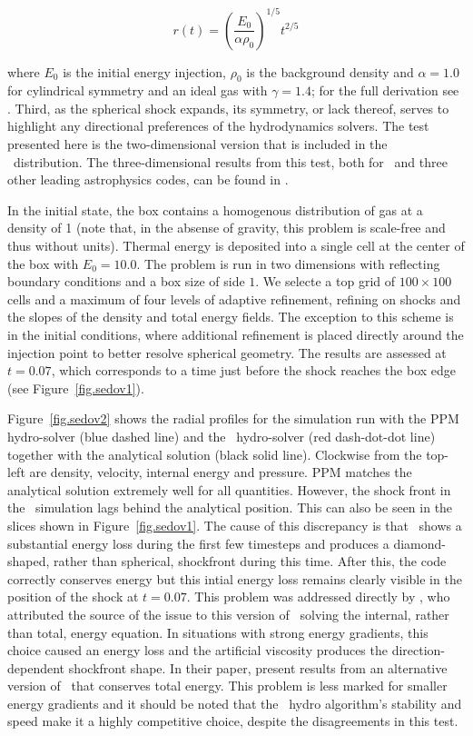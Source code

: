 \begin{equation} r(t) =
\left(\frac{E_0}{\alpha\rho_0}\right)^{1/5}t^{2/5}
\end{equation}

\noindent where $E_0$ is the initial energy injection, $\rho_0$ is the
background density and $\alpha = 1.0$ for cylindrical symmetry and an
ideal gas with $\gamma = 1.4$; for the full derivation see
\citet{Sedov1959}.  Third, as the spherical shock expands, its
symmetry, or lack thereof, serves to highlight any directional
preferences of the hydrodynamics solvers.  The test presented here is
the two-dimensional 
version that is included in the \enzo\ distribution. The
three-dimensional results from this test, both for \enzo\ and three
other leading astrophysics codes, can be found in \citet{Tasker2008}.

In the initial state, the box contains a homogenous distribution of
gas at a density of 1 (note that, in the absense of gravity, this
problem is scale-free and thus without units). Thermal energy is
deposited into a single cell at the center of the box with $E_0 =
10.0$. The problem is run in two dimensions with reflecting
boundary conditions and a box size of side
$1$.  We selecte a top grid of $100 \times 100$
cells and a maximum of four levels of adaptive refinement, refining on
shocks and the slopes of the density and total energy fields. The
exception to this scheme is in the initial conditions, where
additional refinement is placed directly around the injection point to
better resolve spherical geometry. The results are assessed
at $t = 0.07$, which corresponds to a time just before the shock
reaches the box edge (see Figure~\ref{fig.sedov1}).

Figure~\ref{fig.sedov2} shows the radial profiles for the simulation
run with the PPM hydro-solver (blue dashed line) and the \zeus\
hydro-solver (red dash-dot-dot line) together with the analytical
solution (black solid line). Clockwise from the top-left are density,
velocity, internal energy and pressure. PPM matches the analytical
solution extremely well for all quantities. However, the shock front
in the \zeus\ simulation lags behind the analytical position. This can
also be seen in the slices shown in Figure~\ref{fig.sedov1}. The cause
of this discrepancy is that \zeus\ shows a substantial energy loss
during the first few timesteps and produces a diamond-shaped, rather
than spherical, shockfront during this time. After this, the code
correctly conserves energy but this intial energy loss remains clearly
visible in the position of the shock at $t = 0.07$. This problem was
addressed directly by \citet{Clarke2010}, who attributed the source of
the issue to this version of \zeus\ solving the internal, rather than
total, energy equation. In situations with strong energy gradients,
this choice caused an energy loss and the artificial viscosity
produces the direction-dependent shockfront shape. In their paper,
\citet{Clarke2010} present results from an alternative version of
\zeus\ that conserves total energy. This problem is less marked for
smaller energy gradients and it should be noted that the \zeus\ hydro
algorithm's stability and speed make it a highly competitive choice,
despite the disagreements in this test.
